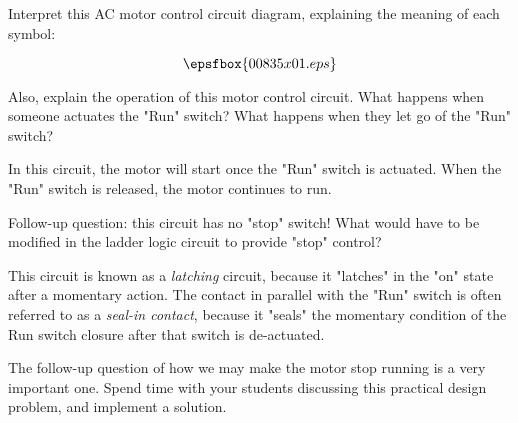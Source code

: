 

Interpret this AC motor control circuit diagram, explaining the meaning of each symbol:

$$\epsfbox{00835x01.eps}$$

Also, explain the operation of this motor control circuit.  What happens when someone actuates the "Run" switch?  What happens when they let go of the "Run" switch?







In this circuit, the motor will start once the "Run" switch is actuated.  When the "Run" switch is released, the motor continues to run.

\vskip 10pt

Follow-up question: this circuit has no "stop" switch!  What would have to be modified in the ladder logic circuit to provide "stop" control?







This circuit is known as a {\it latching} circuit, because it "latches" in the "on" state after a momentary action.  The contact in parallel with the "Run" switch is often referred to as a {\it seal-in contact}, because it "seals" the momentary condition of the Run switch closure after that switch is de-actuated.

The follow-up question of how we may make the motor stop running is a very important one.  Spend time with your students discussing this practical design problem, and implement a solution.




